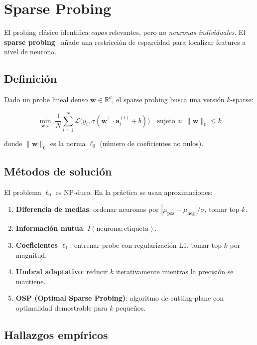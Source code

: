 \documentclass[11pt,a4paper]{report}
\theoremstyle{definition}
\begin{document}
\section{Sparse Probing}

El probing clásico identifica \emph{capas} relevantes, pero no \emph{neuronas individuales}. El \textbf{sparse probing}~\cite{gurnee2023sparseprobing} añade una restricción de esparcidad para localizar features a nivel de neurona.

\subsection{Definición}

Dado un probe lineal denso $\mathbf{w} \in \mathbb{R}^d$, el sparse probing busca una versión $k$-sparse:

\[
\min_{\mathbf{w}, b} \; \frac{1}{N}\sum_{i=1}^N \mathcal{L}\big(y_i, \sigma(\mathbf{w}^\top \cdot \mathbf{a}^{(l)}_i + b)\big) \quad \text{sujeto a: } \|\mathbf{w}\|_0 \leq k
\]

donde $\|\mathbf{w}\|_0$ es la norma $\ell_0$ (número de coeficientes no nulos).

\subsection{Métodos de solución}

El problema $\ell_0$ es NP-duro. En la práctica se usan aproximaciones:

\begin{enumerate}
    \item \textbf{Diferencia de medias}: ordenar neuronas por $|\mu_{\text{pos}} - \mu_{\text{neg}}| / \sigma$, tomar top-$k$.
    \item \textbf{Información mutua}: $I(\text{neurona}; \text{etiqueta})$.
    \item \textbf{Coeficientes $\ell_1$}: entrenar probe con regularización L1, tomar top-$k$ por magnitud.
    \item \textbf{Umbral adaptativo}: reducir $k$ iterativamente mientras la precisión se mantiene.
    \item \textbf{OSP (Optimal Sparse Probing)}: algoritmo de cutting-plane con optimalidad demostrable para $k$ pequeños.
\end{enumerate}

\subsection{Hallazgos empíricos}
\end{document}
